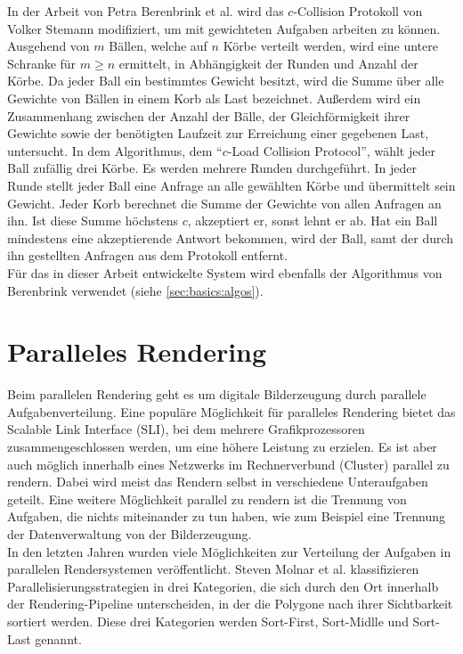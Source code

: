 In der Arbeit von Petra Berenbrink et al. \cite{ccol2} wird das $c$-Collision Protokoll von Volker Stemann \cite{ccol3} modifiziert, um mit gewichteten Aufgaben arbeiten zu können. Ausgehend von $m$ Bällen, welche auf $n$ Körbe verteilt werden, wird eine untere Schranke für $m \ge n$ ermittelt, in Abhängigkeit der Runden und Anzahl der Körbe. Da jeder Ball ein bestimmtes Gewicht besitzt, wird die Summe über alle Gewichte von Bällen in einem Korb als Last bezeichnet. Außerdem wird ein Zusammenhang zwischen der Anzahl der Bälle, der Gleichförmigkeit ihrer Gewichte sowie der benötigten Laufzeit zur Erreichung einer gegebenen Last, untersucht. In dem Algorithmus, dem "`$c$-Load Collision Protocol"', wählt jeder Ball zufällig drei Körbe. Es werden mehrere Runden durchgeführt. In jeder Runde stellt jeder Ball eine Anfrage an alle gewählten Körbe und übermittelt sein Gewicht. Jeder Korb berechnet die Summe der Gewichte von allen Anfragen an ihn. Ist diese Summe höchstens $c$, akzeptiert er, sonst lehnt er ab. Hat ein Ball mindestens eine akzeptierende Antwort bekommen, wird der Ball, samt der durch ihn gestellten Anfragen aus dem Protokoll entfernt.\\
Für das in dieser Arbeit entwickelte System wird ebenfalls der Algorithmus von Berenbrink verwendet (siehe \ref{sec:basics:algos}).
\section{Paralleles Rendering}
\label{sec:relwork:parrender}
Beim parallelen Rendering geht es um digitale Bilderzeugung durch parallele Aufgabenverteilung. Eine populäre Möglichkeit für paralleles Rendering bietet das Scalable Link Interface (SLI), bei dem mehrere Grafikprozessoren zusammengeschlossen werden, um eine höhere Leistung zu erzielen. Es ist aber auch möglich innerhalb eines Netzwerks im Rechnerverbund (Cluster) parallel zu rendern. Dabei wird meist das Rendern selbst in verschiedene Unteraufgaben geteilt. Eine weitere Möglichkeit parallel zu rendern ist die Trennung von Aufgaben, die nichts miteinander zu tun haben, wie zum Beispiel eine Trennung der Datenverwaltung von der Bilderzeugung.\\
In den letzten Jahren wurden viele Möglichkeiten zur Verteilung der Aufgaben in parallelen Rendersystemen veröffentlicht. Steven Molnar et al. \cite{molnar} klassifizieren Parallelisierungsstrategien in drei Kategorien, die sich durch den Ort innerhalb der Rendering-Pipeline unterscheiden, in der die Polygone nach ihrer Sichtbarkeit sortiert werden. Diese drei Kategorien werden Sort-First, Sort-Midlle und Sort-Last genannt.

